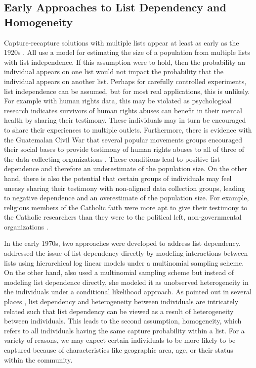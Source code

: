 \documentclass[
  12pt,
]{article}
\begin{document}
\subsection{Early Approaches to List Dependency and Homogeneity}
\label{sec:earlyapproachlitreview}

Capture-recapture solutions with multiple lists appear at least as early
as the 1920s
\citep{geiger_zahl_1924,schnabel_estimation_1938,darroch_multiple-recapture_1958}.
All use a model for estimating the size of a population from multiple
lists with list independence. If this assumption were to hold, then the
probability an individual appears on one list would not impact the
probability that the individual appears on another list. Perhaps for
carefully controlled experiments, list independence can be assumed, but
for most real applications, this is unlikely. For example with human
rights data, this may be violated as psychological research indicates
survivors of human rights abuses can benefit in their mental health by
sharing their testimony. These individuals may in turn be encouraged to
share their experiences to multiple outlets. Furthermore, there is
evidence with the Guatemalan Civil War that several popular movements
groups encouraged their social bases to provide testimony of human
rights abuses to all of three of the data collecting organizations
\citep{ball_making_2000}. These conditions lead to positive list
dependence and therefore an underestimate of the population size. On the
other hand, there is also the potential that certain groups of
individuals may feel uneasy sharing their testimony with non-aligned
data collection groups, leading to negative dependence and an
overestimate of the population size. For example, religious members of
the Catholic faith were more apt to give their testimony to the Catholic
researchers than they were to the political left, non-governmental
organizations \citep{manrique-vallier_capture-recapture_2020}.

In the early 1970s, two approaches were developed to address list
dependency. \cite{fienberg_multiple_1972} addressed the issue of list
dependency directly by modeling interactions between lists using
hierarchical log linear models under a multinomial sampling scheme. On
the other hand, \cite{sanathanan_models_1972} also used a multinomial
sampling scheme but instead of modeling list dependence directly, she
modeled it as unobserved heterogeneity in the individuals under a
conditional likelihood approach. As pointed out in several places
\citep{darroch_three-sample_1993,fienberg_classical_1999,manrique-vallier_capture-recapture_2020},
list dependency and heterogeneity between individuals are intricately
related such that list dependency can be viewed as a result of
heterogeneity between individuals. This leads to the second assumption,
homogeneity, which refers to all individuals having the same capture
probability within a list. For a variety of reasons, we may expect
certain individuals to be more likely to be captured because of
characteristics like geographic area, age, or their status within the
community.
\end{document}
